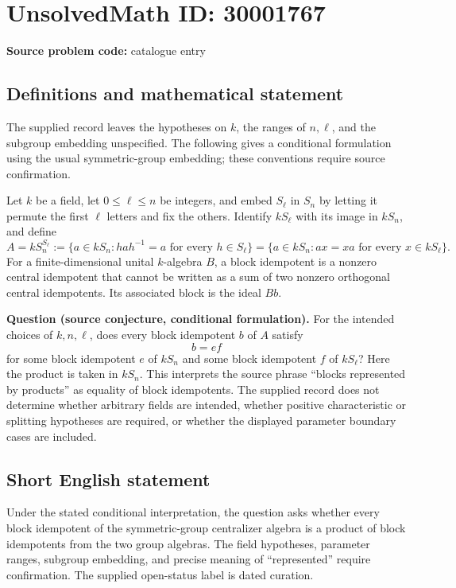 \documentclass[11pt]{article}
\begin{document}
\section*{UnsolvedMath ID: 30001767}
\textbf{Source problem code:} catalogue entry
\subsection{Definitions and mathematical statement}
The supplied record leaves the hypotheses on \(k\), the ranges of \(n,\ell\), and the subgroup embedding unspecified. The following gives a conditional formulation using the usual symmetric-group embedding; these conventions require source confirmation.

Let \(k\) be a field, let \(0\leq \ell\leq n\) be integers, and embed \(S_\ell\) in \(S_n\) by letting it permute the first \(\ell\) letters and fix the others. Identify \(kS_\ell\) with its image in \(kS_n\), and define
\[
A=kS_n^{S_\ell}:=\{a\in kS_n: hah^{-1}=a\text{ for every }h\in S_\ell\}
=\{a\in kS_n: ax=xa\text{ for every }x\in kS_\ell\}.
\]
For a finite-dimensional unital \(k\)-algebra \(B\), a block idempotent is a nonzero central idempotent that cannot be written as a sum of two nonzero orthogonal central idempotents. Its associated block is the ideal \(Bb\).

\textbf{Question (source conjecture, conditional formulation).} For the intended choices of \(k,n,\ell\), does every block idempotent \(b\) of \(A\) satisfy
\[
b=ef
\]
for some block idempotent \(e\) of \(kS_n\) and some block idempotent \(f\) of \(kS_\ell\)? Here the product is taken in \(kS_n\). This interprets the source phrase ``blocks represented by products'' as equality of block idempotents. The supplied record does not determine whether arbitrary fields are intended, whether positive characteristic or splitting hypotheses are required, or whether the displayed parameter boundary cases are included.
\subsection{Short English statement}
Under the stated conditional interpretation, the question asks whether every block idempotent of the symmetric-group centralizer algebra is a product of block idempotents from the two group algebras. The field hypotheses, parameter ranges, subgroup embedding, and precise meaning of ``represented'' require confirmation. The supplied open-status label is dated curation.
\end{document}
